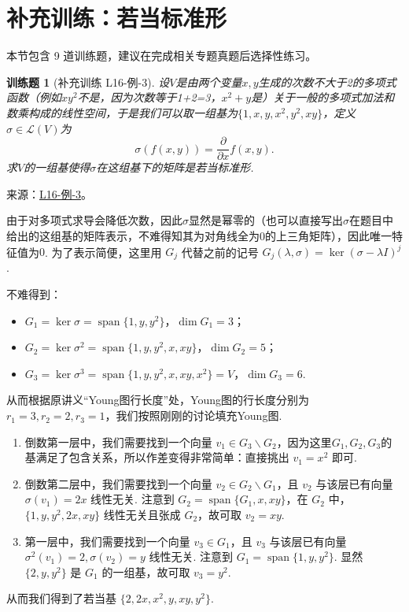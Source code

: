 \documentclass[UTF8,12pt,a4paper,fontset=fandol]{ctexart}
\newtheorem{exercise}{训练题}[section]
\begin{document}
\section{补充训练：若当标准形}

本节包含 9 道训练题，建议在完成相关专题真题后选择性练习。

\begin{exercise}[补充训练 L16-例-3]\label{prob:L16-例-3}
设$V$是由两个变量$x,y$生成的次数不大于2的多项式函数（例如$xy^2$不是，因为次数等于1+2=3，$x^2+y$是）关于一般的多项式加法和数乘构成的线性空间，于是我们可以取一组基为$\{1,x,y,x^2,y^2,xy\}$，定义$\sigma\in \mathcal{L}(V)$为
    \[\sigma(f(x,y))=\dfrac{\partial}{\partial x}f(x,y).\]
    求$V$的一组基使得$\sigma$在这组基下的矩阵是若当标准形.
\end{exercise}
\noindent 来源：\href{https://github.com/yhwu-is/Linear-Algebra-Left-Undone/blob/new/%E8%AE%B2%E4%B9%89/%E4%B8%93%E9%A2%98/16%20%E8%8B%A5%E5%BD%93%E6%A0%87%E5%87%86%E5%BD%A2.tex}{L16-例-3}。
\begin{solve}
由于对多项式求导会降低次数，因此$\sigma$显然是幂零的（也可以直接写出$\sigma$在题目中给出的这组基的矩阵表示，不难得知其为对角线全为$0$的上三角矩阵），因此唯一特征值为$0$. 为了表示简便，这里用 $G_j$ 代替之前的记号 $G_j(\lambda,\sigma)=\ker (\sigma-\lambda I)^j$.

    不难得到：
    \begin{itemize}
        \item $G_1 = \ker \sigma = \operatorname{span}\{1, y, y^2\}$，$\dim G_1 = 3$；
        \item $G_2 = \ker \sigma^2 = \operatorname{span}\{1, y, y^2, x, xy\}$，$\dim G_2 = 5$；
        \item $G_3 = \ker \sigma^3 = \operatorname{span}\{1, y, y^2, x, xy, x^2\} = V$，$\dim G_3 = 6$.
    \end{itemize}

    从而根据原讲义“Young图行长度”处，Young图的行长度分别为 $r_1 = 3, r_2 = 2, r_3 = 1$，我们按照刚刚的讨论填充Young图.

    \begin{enumerate}
        \item 倒数第一层中，我们需要找到一个向量 $v_1 \in G_3 \backslash G_2$，因为这里$G_1, G_2, G_3$的基满足了包含关系，所以作差变得非常简单：直接挑出 $v_1=x^2$ 即可.
        \item 倒数第二层中，我们需要找到一个向量 $v_2 \in G_2 \backslash G_1$，且 $v_2$ 与该层已有向量 $\sigma(v_1)=2x$ 线性无关. 注意到 $G_2 = \operatorname{span}\{G_1, x, xy\}$，在 $G_2$ 中，$\{1, y, y^2, 2x, xy\}$ 线性无关且张成 $G_2$，故可取 $v_2 = xy$.
        \item 第一层中，我们需要找到一个向量 $v_3 \in G_1$，且 $v_3$ 与该层已有向量 $\sigma^2(v_1)=2, \sigma(v_2)=y$ 线性无关. 注意到 $G_1 = \operatorname{span}\{1, y, y^2\}$. 显然 $\{2, y, y^2\}$ 是 $G_1$ 的一组基，故可取 $v_3 = y^2$.
    \end{enumerate}

    从而我们得到了若当基 $\{2, 2x, x^2, y, xy, y^2\}$.
\end{solve}
\end{document}
